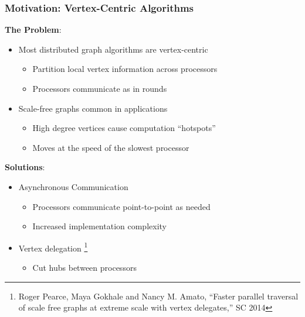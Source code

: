 \documentclass{beamer}
\begin{document}
\begin{frame}
\frametitle{Motivation: Vertex-Centric Algorithms}

\textbf{The Problem}:
\begin{itemize}
	\item Most distributed graph algorithms are vertex-centric
	\begin{itemize}
		\item Partition local vertex information across processors
		\item Processors communicate as in rounds \cite{malewicz2010pregel}
	\end{itemize}
	\item Scale-free graphs common in applications
	\begin{itemize}
		\item High degree vertices cause computation ``hotspots''
		\item Moves at the speed of the slowest processor
	\end{itemize}
\end{itemize}

\textbf{Solutions}:
\begin{itemize}
	\item Asynchronous Communication 
	\begin{itemize}
		\item Processors communicate point-to-point as needed
		\item Increased implementation complexity
	\end{itemize}
	\item Vertex delegation \cite{pearce2014faster}
	\footnote{\scriptsize Roger Pearce, Maya Gokhale and Nancy M. Amato, ``Faster parallel traversal of scale free graphs at extreme scale with vertex delegates,'' SC 2014}
	\begin{itemize}
		\item Cut hubs between processors
	\end{itemize}
\end{itemize}


\end{frame}

\end{document}
